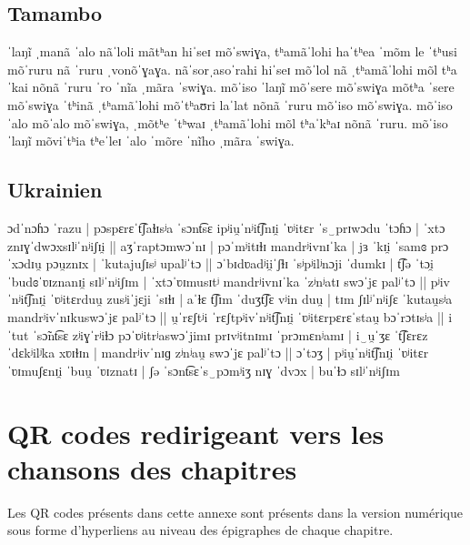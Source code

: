 \section[Tamambo]{Tamambo \parencite{riehlTamambo2005}\\}

{ˈlaŋĩ ˌmanã ˈalo nãˈloli mãtʰan hiˈseɪ mõˈswiɣa, tʰamãˈlohi haˈtʰea ˈmõm le ˈtʰusi
mõˈruru nã ˈruru ˌvonõˈɣaɣa. nãˈsorˌasoˈrahi hiˈseɪ mõˈlol nã ˌtʰamãˈlohi mõl tʰaˈkai
nõnã ˈruru ˈro ˈnĩa ˌmãra ˈswiɣa. mõˈiso ˈlaŋĩ mõˈsere mõˈswiɣa mõtʰa ˈsere
mõˈswiɣa ˈtʰinã ˌtʰamãˈlohi  mõˈtʰaʊri laˈlat nõnã ˈruru mõˈiso mõˈswiɣa. mõˈiso
ˈalo mõˈalo mõˈswiɣa, ˌmõtʰe ˈtʰwaɪ ˌtʰamãˈlohi mõl tʰaˈkʰaɪ nõnã ˈruru. mõˈiso ˈlaŋĩ
mõviˈtʰia tʰeˈleɪ ˈalo ˈmõre ˈnĩho ˌmãra ˈswiɣa.}

\section[Ukrainien]{Ukrainien \parencite{pompino-marschallUkrainian2017}\\}
{
ɔdˈnɔɦɔ ˈrazu | pɔspɛrɛˈt͡ʃaɫɪsʲa ˈsɔnt͡sɛ ipʲiu̯ˈnʲit͡ʃnɪi̯ ˈʋʲitɛr ˈs‿prɪwɔdu ˈtɔɦɔ |
ˈxtɔ znɪɣˈdwɔxsɪlʲˈnʲiʃɪi̯ || aʒˈraptɔmwɔˈnɪ | pɔˈmʲitɪɫɪ mandrʲivnɪˈka | jɜ ˈkɪi̯
ˈsamɞ prɔˈxɔdɪu̯ pɔu̯znɪx | ˈkutajuʃɪsʲ upalʲˈtɔ || ɔˈbɪdʋadʲii̯ˈʃɫɪ ˈsʲpʲilʲnɔji
ˈdumkɪ | t͡ʃə ˈtɔi̯ ˈbudɞˈʋɪznanɪi̯ sɪlʲˈnʲiʃɪm | ˈxtɔˈʋɪmusɪtʲ mandrʲivnɪˈka
ˈzʲnʲatɪ swɔˈjɛ palʲˈtɔ || pʲivˈnʲit͡ʃnɪi̯ ˈʋʲitɛrduu̯ zusʲiˈjɛji ˈsɪɫɪ | aˈɫɛ t͡ʃɪm
ˈduʒt͡ʃɛ vʲin duu̯ | tɪm ʃɪlʲˈnʲiʃɛ ˈkutau̯sʲa mandrʲivˈnɪkuswɔˈjɛ palʲˈtɔ ||
u̯ˈrɛʃtʲi ˈrɛʃtpʲivˈnʲit͡ʃnɪi̯ ˈʋʲitɛrpɛrɛˈstau̯ bɔˈrɔtɪsʲa || i ˈtut ˈsɔ̃nt͡sɛ zʲiɣˈrʲiɫɔ
pɔˈʋʲitrʲaswɔˈjimɪ prɪvʲitnɪmɪ ˈprɔmɛnʲamɪ | i‿u̯ˈʒɛ ˈt͡ʃɛrɛz ˈdɛkʲilʲka xʋɪɫɪn |
mandrʲivˈnɪɡ zʲnʲau̯ swɔˈjɛ palʲˈtɔ || ɔˈtɔʒ | pʲiu̯ˈnʲit͡ʃnɪi̯ ˈʋʲitɛr ˈʋɪmuʃɛnɪi̯ ˈbuu̯
ˈʋɪznatɪ | ʃə ˈsɔnt͡sɛˈs‿pɔmʲiʒ nɪɣ ˈdvɔx | buˈɫɔ sɪlʲˈnʲiʃɪm}


\chapter[QR codes redirigeant vers les chansons des chapitres]{QR codes redirigeant vers les\\chansons des chapitres}\label{chap:ann_qrcode}
\endgroup

Les QR codes présents dans cette annexe sont présents dans la version numérique sous forme d'hyperliens au niveau des épigraphes de chaque chapitre.


